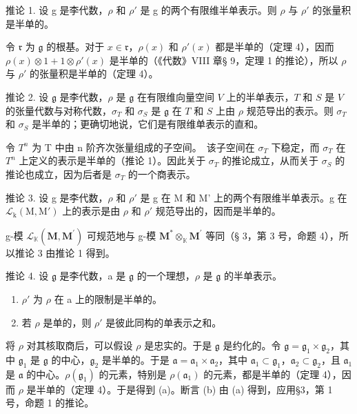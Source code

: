 推论 1. 设 g 是李代数，\(\rho\) 和 \(\rho'\) 是 g 的两个有限维半单表示。则 \(\rho\) 与 \(\rho'\) 的张量积是半单的。

令 \(\mathfrak{r}\) 为 \(\mathfrak{g}\) 的根基。对于 \(x \in \mathfrak{r}\)，\(\rho(x)\) 和 \(\rho'(x)\) 都是半单的（定理 4），因而 \(\rho(x) \otimes 1 + 1 \otimes \rho'(x)\) 是半单的（《代数》VIII 章§ 9，定理 1 的推论），所以 \(\rho\) 与 \(\rho'\) 的张量积是半单的（定理 4）。

推论 2. 设 \(\mathfrak{g}\) 是李代数，\(\rho\) 是 \(\mathfrak{g}\) 在有限维向量空间 \(V\) 上的半单表示，\(T\) 和 \(S\) 是 \(V\) 的张量代数与对称代数，\(\sigma_{T}\) 和 \(\sigma_{S}\) 是 \(\mathfrak{g}\) 在 \(T\) 和 \(S\) 上由 \(\rho\) 规范导出的表示。则 \(\sigma_{T}\) 和 \(\sigma_{S}\) 是半单的；更确切地说，它们是有限维单表示的直和。

令 \(T^{n}\) 为 T 中由 n 阶齐次张量组成的子空间。~该子空间在 \(\sigma_{T}\) 下稳定，而 \(\sigma_{T}\) 在 \(T^{n}\) 上定义的表示是半单的（推论 1）。因此关于 \(\sigma_{T}\) 的推论成立，从而关于 \(\sigma_{S}\) 的推论也成立，因为后者是 \(\sigma_{T}\) 的一个商表示。

推论 3. 设 g 是李代数，\(\rho\) 和 \(\rho'\) 是 g 在 M 和 M' 上的两个有限维半单表示。g 在 \(\mathcal{L}_{\mathrm{k}}(\mathrm{M},\mathrm{M}')\) 上的表示是由 \(\rho\) 和 \(\rho'\) 规范导出的，因而是半单的。

g-模 \(\mathcal{L}_{\mathbb{K}}(\mathbf{M},\mathbf{M}^{\prime})\) 可规范地与 g-模 \(\mathbf{M}^{*}\otimes_{\mathbb{K}}\mathbf{M}^{\prime}\) 等同（§ 3，第 3 号，命题 4），所以推论 3 由推论 1 得到。

推论 4. 设 \(\mathfrak{g}\) 是李代数，a 是 \(\mathfrak{g}\) 的一个理想，\(\rho\) 是 \(\mathfrak{g}\) 的半单表示。

\begin{enumerate}
\def\labelenumi{(\alph{enumi})}
\item
  \(\rho'\) 为 \(\rho\) 在 a 上的限制是半单的。
\item
  若 \(\rho\) 是单的，则 \(\rho'\) 是彼此同构的单表示之和。
\end{enumerate}

将 \(\rho\) 对其核取商后，可以假设 \(\rho\) 是忠实的。于是 \(\mathfrak{g}\) 是约化的。令 \(\mathfrak{g} = \mathfrak{g}_1 \times \mathfrak{g}_2\)，其中 \(\mathfrak{g}_1\) 是 \(\mathfrak{g}\) 的中心，\(\mathfrak{g}_2\) 是半单的。于是 \(\mathfrak{a} = \mathfrak{a}_1 \times \mathfrak{a}_2\)，其中 \(\mathfrak{a}_1 \subset \mathfrak{g}_1\)，\(\mathfrak{a}_2 \subset \mathfrak{g}_2\)，且 \(\mathfrak{a}_1\) 是 \(\mathfrak{a}\) 的中心。\(\rho(\mathfrak{g}_1)\) 的元素，特别是 \(\rho(\mathfrak{a}_1)\) 的元素，都是半单的（定理 4），因而 \(\rho\) 是半单的（定理 4）。于是得到 (a)。断言 (b) 由 (a) 得到，应用§3，第 1 号，命题 1 的推论。

